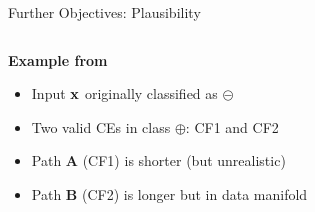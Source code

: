 \documentclass[10pt,compress,t,notes=noshow, xcolor=table]{beamer}
\begin{document}
\begin{frame}{Further Objectives: Plausibility}
{\begin{columns}[c, totalwidth=\textwidth]
\begin{column}{0.6\textwidth}
    \textbf{Example from } 
    \begin{itemize}
        \item Input \textcolor{blue}{$\mathbf{x}$} originally classified as $\pmb{\circleddash}$ 
        \item Two valid CEs in class $\pmb\oplus$: {\color{Red} CF1} and {\color{Green} CF2}
        \item {\color{Red} Path \textbf{A} (CF1)} is shorter (but unrealistic)
        \item {\color{Green} Path \textbf{B} (CF2)} is longer but in data manifold
    \end{itemize}
\end{column}
\end{columns}
}

\end{frame}
\end{document}
